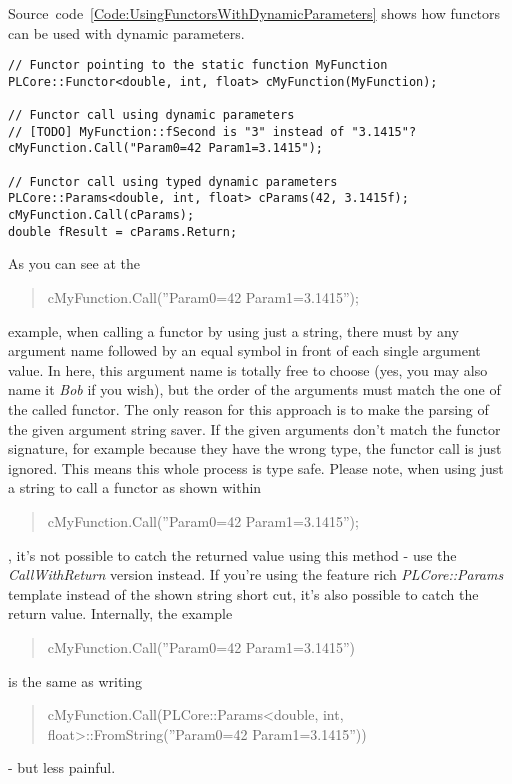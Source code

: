 Source~code~\ref{Code:UsingFunctorsWithDynamicParameters} shows how functors can be used with dynamic parameters.
\begin{lstlisting}[float=htb,label=Code:UsingFunctorsWithDynamicParameters,caption={Using functors with dynamic parameters}]
// Functor pointing to the static function MyFunction
PLCore::Functor<double, int, float> cMyFunction(MyFunction);

// Functor call using dynamic parameters
// [TODO] MyFunction::fSecond is "3" instead of "3.1415"?
cMyFunction.Call("Param0=42 Param1=3.1415");

// Functor call using typed dynamic parameters
PLCore::Params<double, int, float> cParams(42, 3.1415f);
cMyFunction.Call(cParams);
double fResult = cParams.Return;
\end{lstlisting}
As you can see at the \begin{quote}cMyFunction.Call(''Param0=42 Param1=3.1415'');\end{quote} example, when calling a functor by using just a string, there must by any argument name followed by an equal symbol in front of each single argument value. In here, this argument name is totally free to choose (yes, you may also name it \emph{Bob} if you wish), but the order of the arguments must match the one of the called functor. The only reason for this approach is to make the parsing of the given argument string saver. If the given arguments don't match the functor signature, for example because they have the wrong type, the functor call is just ignored. This means this whole process is type safe. Please note, when using just a string to call a functor as shown within \begin{quote}cMyFunction.Call(''Param0=42 Param1=3.1415'');\end{quote}, it's not possible to catch the returned value using this method - use the \emph{CallWithReturn} version instead. If you're using the feature rich \emph{PLCore::Params} template instead of the shown string short cut, it's also possible to catch the return value. Internally, the example \begin{quote}cMyFunction.Call(''Param0=42 Param1=3.1415'')\end{quote} is the same as writing \begin{quote}cMyFunction.Call(PLCore::Params<double, int, float>::FromString(''Param0=42 Param1=3.1415''))\end{quote} - but less painful.

